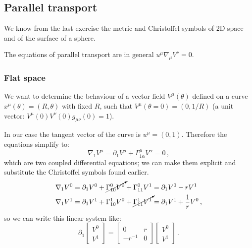 \documentclass[main.tex]{subfiles}
\begin{document}
\subsection{Parallel transport}

We know from the last exercise the metric and Christoffel symbols of 2D space and of the surface of a sphere.



The equations of parallel transport are in general \(u^{\mu }\nabla_{\mu }V^{\nu } = 0\).

\subsubsection{Flat space}

We want to determine the behaviour of a vector field \(V^{\mu }(\theta )\) defined on a curve \(x^{\mu }(\theta ) = (R, \theta)\) with fixed \(R\), such that \(V^{ \mu } (\theta = 0 ) = (0,1/R)\) (a unit vector: \(V^{\mu } (0) V^{\nu }(0) g_{\mu \nu }(0) = 1\)).

In our case the tangent vector of the curve is \(u^{\mu }= (0,1)\). Therefore the equations simplify to: 
%
\begin{equation}
  \nabla_{1}V^{\mu }= \partial_{1}V^{\mu }+\Gamma^{\mu }_{1 \alpha }V^{\alpha } = 0
\,,
\end{equation}
%
which are two coupled differential equations; we can make them explicit and substitute the Christoffel symbols found earlier. 
%
\begin{subequations}
\begin{align}
  \nabla_{1}V^{0} &= \partial_1 V^{0} + \cancelto{}{\Gamma^{0}_{10}V^{0}} + \Gamma^{0}_{11}V^{1}
  = \partial_1 V^{0} - r V^{1}  \\
  \nabla_{1}V^{1} &= \partial_1 V^{1} + \Gamma^{1}_{10}V^{0} + \cancelto{}{\Gamma^{1}_{11}V^{1}} 
  = \partial_{1}V^{1} + \frac{1}{r} V^{0}
\,,
\end{align}
\end{subequations}
%
so we can write this linear system like: 
%
\begin{equation}\label{diffeqes3}
  \partial_{1} \left[\begin{array}{c}
  V^{0} \\ 
  V^{1}
  \end{array}\right]
  =
  \left[\begin{array}{cc}
  0 & r \\ 
  -r^{-1} & 0
  \end{array}\right]
  \left[\begin{array}{c}
  V^{0} \\ 
  V^{1}
  \end{array}\right]
\,.
\end{equation}
%
\end{document}
